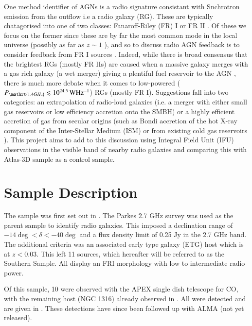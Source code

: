 \documentclass[a4paper,fleqn,usenatbib,useAMS]{mnras}
\begin{document}
	One method identifier of AGNs is a radio signature consistant with Snchrotron emission from the outflow i.e a radio galaxy (RG). These are typically chatagorised into one of two classes: Fanaroff-Riley (FR) I or FR II \citep{Fanaroff1974}. Of these we focus on the former since these are by far the most common mode in the local universe (possibly as far as $z \sim 1$ \citep{Rigby2008}), and so to discuss radio AGN feedback is to consider feedback from FR I sources \citep{DeYoung2010}. Indeed, while there is broad consensus \citep{Heckman1986, Baum1992} that the brightest RGs (mostly FR IIs) are caused when a massive galaxy merges with a gas rich galaxy (a wet merger) giving a plentiful fuel reservoir to the AGN \citep{Baum1992}, there is much more debate when it comes to low-powered ($P_\mathrt{1.4 GHz} \lesssim 10^{24.5} \, \mathrm{W Hz^{-1}}$) RGs (mostly FR I). Suggestions fall into two categories: an extrapolation of radio-loud galaxies (i.e. a merger with either small gas reservoirs or low efficiency accretion onto the SMBH) or a highly efficient accretion of gas from secular origins (such as Bondi accretion of the hot X-ray component of the Inter-Stellar Medium (ISM) \citep{Allen2006} or from existing cold gas reservoirs \citep{Prandoni2010}). This project aims to add to this discussion using Integral Field Unit (IFU) observations in the visible band of nearby radio galaxies and comparing this with Atlas-3D sample \citep{Cappellari2011} as a control sample.


\section{Sample Description}
	\label{sec:samp}
	The sample was first set out in \citet{Prandoni2010}. The Parkes 2.7 GHz survey was used as the parent sample to identify radio galaxies. This imposed a declination range of $-14\deg < \delta < -40\deg$ and a flux density limit of 0.25 Jy in the 2.7 GHz band. The additional criteria was an associated early type galaxy (ETG) host which is at $z<0.03$. This left 11 sources, which hereafter will be referred to as the Southern Sample. All display an FRI morphology with low to intermediate radio power.

	Of this sample, 10 were observed with the APEX single dish telescope for CO, with the remaining host (NGC 1316) already observed in \citet{Horellou2001}. All were detected and are given in \citet{Prandoni2010}. These detections have since been followed up with ALMA (not yet released). 
\end{document}
